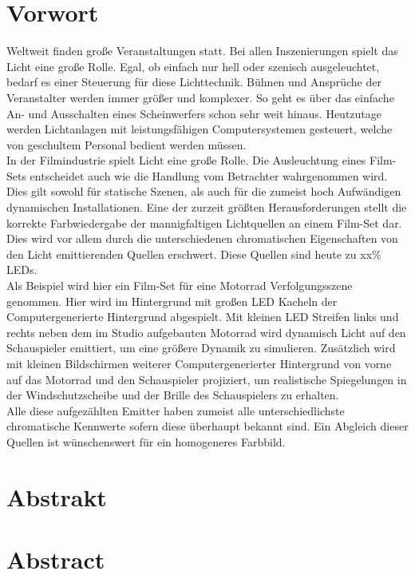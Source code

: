 \documentclass[11pt]{scrartcl}
\begin{document}
\section{Vorwort}
Weltweit finden große Veranstaltungen statt. Bei allen Inszenierungen spielt das Licht eine 
große Rolle. Egal, ob einfach nur hell oder szenisch ausgeleuchtet, bedarf es einer Steuerung 
für diese Lichttechnik. Bühnen und Ansprüche der Veranstalter werden immer größer und komplexer. 
So geht es über das einfache An- und Ausschalten eines Scheinwerfers schon sehr weit hinaus. 
Heutzutage werden Lichtanlagen mit leistungsfähigen Computersystemen gesteuert, welche von 
geschultem Personal bedient werden müssen.\\
In der Filmindustrie spielt Licht eine große Rolle. Die Ausleuchtung eines Film-Sets entscheidet 
auch wie die Handlung vom Betrachter wahrgenommen wird. Dies gilt sowohl für statische Szenen, 
als auch für die zumeist hoch Aufwändigen dynamischen Installationen.
Eine der zurzeit größten Herausforderungen stellt die korrekte Farbwiedergabe der mannigfaltigen 
Lichtquellen an einem Film-Set dar.
Dies wird vor allem durch die unterschiedenen chromatischen Eigenschaften von den Licht 
emittierenden Quellen erschwert. Diese Quellen sind heute zu xx\% LEDs.\\
Als Beispiel wird hier ein Film-Set für eine Motorrad Verfolgungsszene genommen. Hier wird im 
Hintergrund mit großen LED Kacheln der Computergenerierte Hintergrund abgespielt. Mit kleinen 
LED Streifen links und rechts neben dem im Studio aufgebauten Motorrad wird dynamisch Licht auf 
den Schauspieler emittiert, um eine größere Dynamik zu simulieren.
Zusätzlich wird mit kleinen Bildschirmen weiterer Computergenerierter Hintergrund von vorne auf 
das Motorrad und den Schauspieler projiziert, um realistische Spiegelungen in der 
Windschutzscheibe und der Brille des Schauspielers zu erhalten.\\
Alle diese aufgezählten Emitter haben zumeist alle unterschiedlichste chromatische Kennwerte 
sofern diese überhaupt bekannt sind. Ein Abgleich dieser Quellen ist wünschenswert für ein 
homogeneres Farbbild. 
\clearpage

\section{Abstrakt}
\section{Abstract}
\clearpage
\end{document}
